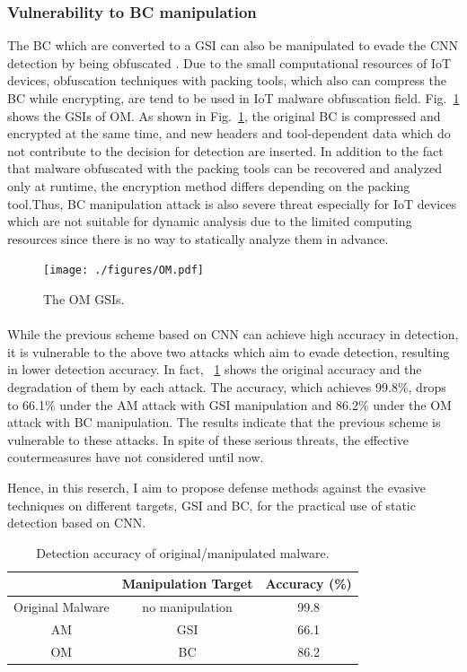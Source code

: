 \documentclass{ieeeaccess}
\newcommand{\myfigurename}{Fig.}
\begin{document}
\subsubsection{Vulnerability to BC manipulation}
The BC which are converted to a GSI can also be manipulated to evade the CNN detection by being obfuscated \cite{om}.
Due to the small computational resources of IoT devices, obfuscation techniques with packing tools, which also can compress the BC while encrypting, are tend to be used in IoT malware obfuscation field.
\myfigurename~\ref{fig:omGSI} shows the GSIs of OM.
As shown in \myfigurename~\ref{fig:omGSI}, the original BC is compressed and encrypted at the same time, and new headers and tool-dependent data which do not contribute to the decision for detection are inserted.
In addition to the fact that malware obfuscated with the packing tools can be recovered and analyzed only at runtime, the encryption method differs depending on the packing tool.Thus, BC manipulation attack is also severe threat especially for IoT devices which are not suitable for dynamic analysis due to the limited computing resources since there is no way to statically analyze them in advance.

\begin{figure}[t]
 \centering
 \texttt{[image: ./figures/OM.pdf]}
 \caption{The OM GSIs.} 
 \label{fig:omGSI}
\end{figure}

\paragraph*{}
While the previous scheme based on CNN can achieve high accuracy in detection, it is vulnerable to the above two attacks which aim to evade detection, resulting in lower detection accuracy.
In fact, \tablename~\ref{tab:prev} shows the original accuracy and the degradation of them by each attack.
The accuracy, which achieves 99.8\%, drops to 66.1\% under the AM attack with GSI manipulation and 86.2\% under the OM attack with BC manipulation.
The results indicate that the previous scheme is vulnerable to these attacks.
In spite of these serious threats, the effective coutermeasures have not considered until now.

Hence, in this reserch, I aim to propose defense methods against the evasive techniques on different targets, GSI and BC, for the practical use of static detection based on CNN.

\begin{table}[h]
  \begin{center}
    \caption{Detection accuracy of original/manipulated malware.}
    \label{tab:prev} 
    \begin{tabular}{|c|c|c|} \hline
       & Manipulation Target & Accuracy (\%) \\ \hline \hline
      Original Malware & no manipulation  & 99.8  \\ \hline
      AM & GSI & 66.1  \\ \hline 
      OM & BC & 86.2 \\ \hline
    \end{tabular}
  \end{center}
\end{table} 
\end{document}
